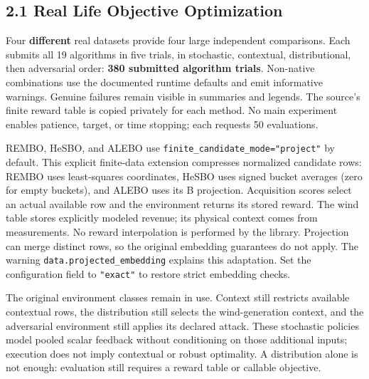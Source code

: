 \documentclass[10pt,a4paper]{article}
\begin{document}
\subsection*{2.1 Real Life Objective Optimization}

Four \textbf{different} real datasets provide four large independent comparisons. Each submits all 19 algorithms in five trials,\allowbreak{} in stochastic,\allowbreak{} contextual,\allowbreak{} distributional,\allowbreak{} then adversarial order: \textbf{380 submitted algorithm trials}. Non-native combinations use the documented runtime defaults and emit informative warnings. Genuine failures remain visible in summaries and legends. The source's finite reward table is copied privately for each method. No main experiment enables patience,\allowbreak{} target,\allowbreak{} or time stopping; each requests 50 evaluations.


REMBO,\allowbreak{} HeSBO,\allowbreak{} and ALEBO use \texttt{finite\_\allowbreak{}candidate\_\allowbreak{}mode=\allowbreak{}"project"} by default. This explicit finite-data extension compresses normalized candidate rows: REMBO uses least-squares coordinates,\allowbreak{} HeSBO uses signed bucket averages (zero for empty buckets),\allowbreak{} and ALEBO uses its B projection. Acquisition scores select an actual available row and the environment returns its stored reward. The wind table stores explicitly modeled revenue; its physical context comes from measurements. No reward interpolation is performed by the library. Projection can merge distinct rows,\allowbreak{} so the original embedding guarantees do not apply. The warning \texttt{data.\allowbreak{}projected\_\allowbreak{}embedding} explains this adaptation. Set the configuration field to \texttt{"exact"} to restore strict embedding checks.


The original environment classes remain in use. Context still restricts available contextual rows,\allowbreak{} the distribution still selects the wind-generation context,\allowbreak{} and the adversarial environment still applies its declared attack. These stochastic policies model pooled scalar feedback without conditioning on those additional inputs; execution does not imply contextual or robust optimality. A distribution alone is not enough: evaluation still requires a reward table or callable objective.
\end{document}
